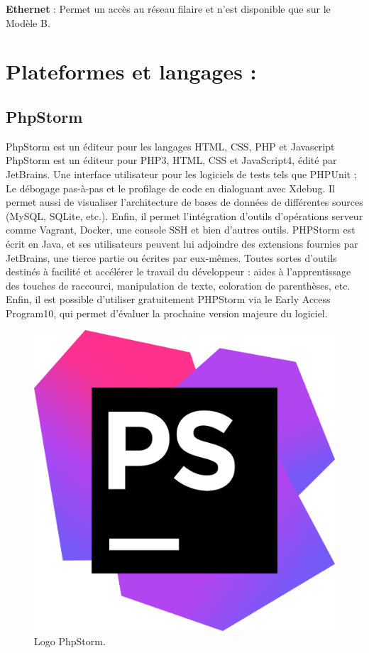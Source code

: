 \documentclass[12pt,a4paper]{report}
\begin{document}
\noindent \begin{flushleft}
	
\end{flushleft}

\noindent \textbf{Ethernet }: Permet un acc\`{e}s au r\'{e}seau filaire et n'est disponible que sur le Mod\`{e}le B.


\section{Plateformes et langages :}
\subsection{PhpStorm}
PhpStorm est un éditeur pour les langages HTML, CSS, PHP et Javascript PhpStorm est un éditeur pour PHP3, HTML, CSS et JavaScript4, édité par JetBrains.
Une interface utilisateur pour les logiciels de tests tels que PHPUnit ; Le débogage pas-à-pas et le profilage de code en dialoguant avec Xdebug.
Il permet aussi de visualiser l'architecture de bases de données de différentes sources (MySQL, SQLite, etc.).
Enfin, il permet l'intégration d'outils d'opérations serveur comme Vagrant, Docker, une console SSH et bien d'autres outils.
PHPStorm est écrit en Java, et ses utilisateurs peuvent lui adjoindre des extensions fournies par JetBrains, une tierce partie ou écrites par eux-mêmes.
Toutes sortes d'outils destinés à facilité et accélérer le travail du développeur : aides à l'apprentissage des touches de raccourci, manipulation de texte, coloration de parenthèses, etc.
Enfin, il est possible d'utiliser gratuitement PHPStorm via le Early Access Program10, qui permet d'évaluer la prochaine version majeure du logiciel.
	\begin{figure}[H]
	\centering
	\includegraphics[width=0.3\linewidth]{phpstorm}
	\caption{Logo PhpStorm.}
	
\end{figure}
\end{document}

